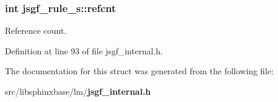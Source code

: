 \subsubsection[{refcnt}]{\setlength{\rightskip}{0pt plus 5cm}int jsgf\-\_\-rule\-\_\-s\-::refcnt}\label{structjsgf__rule__s_aeb4c05f6daa425a37d362e2c6de1228e}


Reference count. 



Definition at line 93 of file jsgf\-\_\-internal.\-h.



The documentation for this struct was generated from the following file\-:\begin{DoxyCompactItemize}
\item 
src/libsphinxbase/lm/{\bf jsgf\-\_\-internal.\-h}\end{DoxyCompactItemize}
